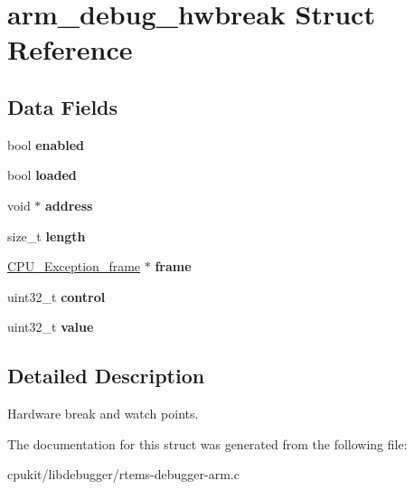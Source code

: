 \hypertarget{structarm__debug__hwbreak}{}\section{arm\+\_\+debug\+\_\+hwbreak Struct Reference}
\label{structarm__debug__hwbreak}
\subsection*{Data Fields}
\begin{DoxyCompactItemize}
\item 
\mbox{\label{structarm__debug__hwbreak_a82248f16c61dc1630efa63583ab26b48}} 
bool {\bfseries enabled}
\item 
\mbox{\label{structarm__debug__hwbreak_a0f355527ccac1db9bc51c6d132f6fefc}} 
bool {\bfseries loaded}
\item 
\mbox{\label{structarm__debug__hwbreak_a99bbc0c48c5cb6a2b672f045d4938074}} 
void $\ast$ {\bfseries address}
\item 
\mbox{\label{structarm__debug__hwbreak_a3f7458e66e1a817123211b1dd551fb4d}} 
size\+\_\+t {\bfseries length}
\item 
\mbox{\label{structarm__debug__hwbreak_a19d1c1c799f8e01fb09e27faa32e8a7e}} 
\mbox{\hyperlink{structCPU__Exception__frame}{C\+P\+U\+\_\+\+Exception\+\_\+frame}} $\ast$ {\bfseries frame}
\item 
\mbox{\label{structarm__debug__hwbreak_a7293b5abff210dfe87b4727c0c4455a4}} 
uint32\+\_\+t {\bfseries control}
\item 
\mbox{\label{structarm__debug__hwbreak_a597506bfbe96be85f8b6e81ee314d7a4}} 
uint32\+\_\+t {\bfseries value}
\end{DoxyCompactItemize}


\subsection{Detailed Description}
Hardware break and watch points. 

The documentation for this struct was generated from the following file\+:\begin{DoxyCompactItemize}
\item 
cpukit/libdebugger/rtems-\/debugger-\/arm.\+c\end{DoxyCompactItemize}
